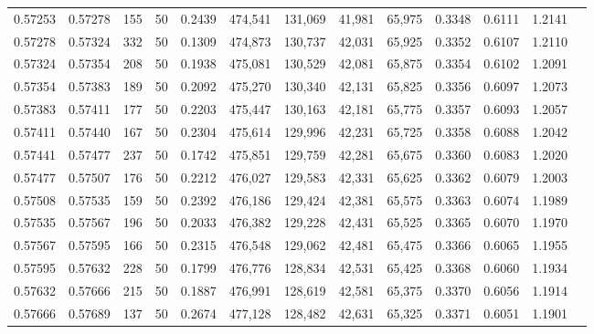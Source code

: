 \begin{tabular}{rrrrrrrrrrrrr}
0.57253 & 0.57278 &   155 &  50 &                                     0.2439 & 474,541 & 131,069 &  41,981 &  65,975 & 0.3348 & 0.6111 & 1.2141 \\
0.57278 & 0.57324 &   332 &  50 &                                     0.1309 & 474,873 & 130,737 &  42,031 &  65,925 & 0.3352 & 0.6107 & 1.2110 \\
0.57324 & 0.57354 &   208 &  50 &                                     0.1938 & 475,081 & 130,529 &  42,081 &  65,875 & 0.3354 & 0.6102 & 1.2091 \\
0.57354 & 0.57383 &   189 &  50 &                                     0.2092 & 475,270 & 130,340 &  42,131 &  65,825 & 0.3356 & 0.6097 & 1.2073 \\
0.57383 & 0.57411 &   177 &  50 &                                     0.2203 & 475,447 & 130,163 &  42,181 &  65,775 & 0.3357 & 0.6093 & 1.2057 \\
0.57411 & 0.57440 &   167 &  50 &                                     0.2304 & 475,614 & 129,996 &  42,231 &  65,725 & 0.3358 & 0.6088 & 1.2042 \\
0.57441 & 0.57477 &   237 &  50 &                                     0.1742 & 475,851 & 129,759 &  42,281 &  65,675 & 0.3360 & 0.6083 & 1.2020 \\
0.57477 & 0.57507 &   176 &  50 &                                     0.2212 & 476,027 & 129,583 &  42,331 &  65,625 & 0.3362 & 0.6079 & 1.2003 \\
0.57508 & 0.57535 &   159 &  50 &                                     0.2392 & 476,186 & 129,424 &  42,381 &  65,575 & 0.3363 & 0.6074 & 1.1989 \\
0.57535 & 0.57567 &   196 &  50 &                                     0.2033 & 476,382 & 129,228 &  42,431 &  65,525 & 0.3365 & 0.6070 & 1.1970 \\
0.57567 & 0.57595 &   166 &  50 &                                     0.2315 & 476,548 & 129,062 &  42,481 &  65,475 & 0.3366 & 0.6065 & 1.1955 \\
0.57595 & 0.57632 &   228 &  50 &                                     0.1799 & 476,776 & 128,834 &  42,531 &  65,425 & 0.3368 & 0.6060 & 1.1934 \\
0.57632 & 0.57666 &   215 &  50 &                                     0.1887 & 476,991 & 128,619 &  42,581 &  65,375 & 0.3370 & 0.6056 & 1.1914 \\
0.57666 & 0.57689 &   137 &  50 &                                     0.2674 & 477,128 & 128,482 &  42,631 &  65,325 & 0.3371 & 0.6051 & 1.1901 \\

\end{tabular}
